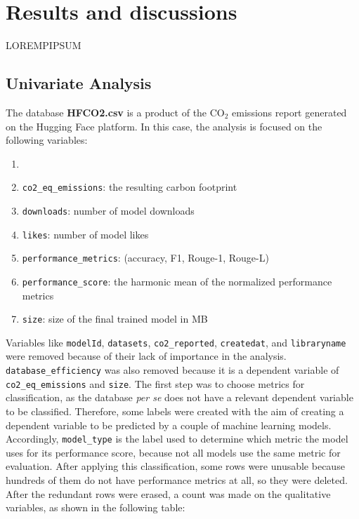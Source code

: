 \documentclass[journal]{IEEEtran}
\begin{document}
	\section{Results and discussions}

	\label{sec:results}
LOREMPIPSUM

	 \subsection{Univariate Analysis}
	 \label{ssec:unianal}
	 The database \textbf{HFCO2.csv} is a product of the $\text{CO}_2$ emissions report generated on the Hugging Face platform. In this case, the analysis is focused on the following variables:

	 \begin{enumerate}
	 	\item[]\hspace{-\labelwidth}\hspace{-\labelsep}
	 	\item \texttt{co2\_eq\_emissions}: the resulting carbon footprint
	 	\item \texttt{downloads}: number of model downloads
	 	\item \texttt{likes}: number of model likes
	 	\item \texttt{performance\_metrics}: (accuracy, F1, Rouge-1, Rouge-L)
	 	\item \texttt{performance\_score}: the harmonic mean of the normalized performance metrics
	 	\item \texttt{size}: size of the final trained model in MB
	 \end{enumerate}
	 Variables like \texttt{modelId}, \texttt{datasets}, \texttt{co2\_reported}, \texttt{createdat}, and \texttt{libraryname} were removed because of their lack of importance in the analysis. \texttt{database\_efficiency} was also removed because it is a dependent variable of \texttt{co2\_eq\_emissions} and \texttt{size}.
	 The first step was to choose metrics for classification, as the database \textit{per se} does not have a relevant dependent variable to be classified. Therefore, some labels were created with the aim of creating a dependent variable to be predicted by a couple of machine learning models. Accordingly, \texttt{model\_type} is the label used to determine which metric the model uses for its performance score, because not all models use the same metric for evaluation. After applying this classification, some rows were unusable because hundreds of them do not have performance metrics at all, so they were deleted.
	 After the redundant rows were erased, a count was made on the qualitative variables, as shown in the following table:
\end{document}
